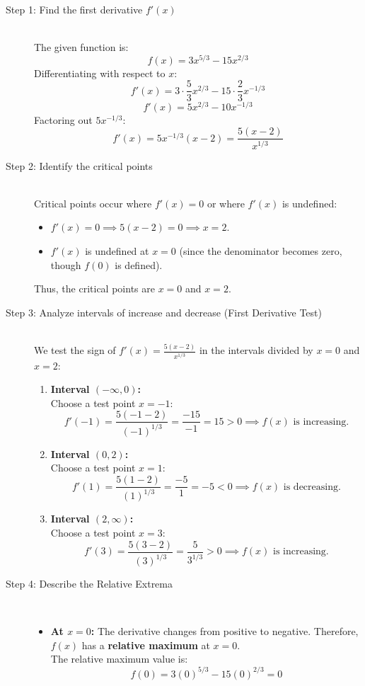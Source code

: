 \documentclass[11pt, a4paper]{article}
\begin{document}
\begin{description}
    \item[Step 1: Find the first derivative $f'(x)$] \ \\
    The given function is:
    \[ f(x) = 3x^{5/3} - 15x^{2/3} \]
    Differentiating with respect to $x$:
    \[ f'(x) = 3 \cdot \frac{5}{3}x^{2/3} - 15 \cdot \frac{2}{3}x^{-1/3} \]
    \[ f'(x) = 5x^{2/3} - 10x^{-1/3} \]
    Factoring out $5x^{-1/3}$:
    \[ f'(x) = 5x^{-1/3}(x - 2) = \frac{5(x - 2)}{x^{1/3}} \]

    \item[Step 2: Identify the critical points] \ \\
    Critical points occur where $f'(x) = 0$ or where $f'(x)$ is undefined:
    \begin{itemize}
        \item $f'(x) = 0 \implies 5(x - 2) = 0 \implies x = 2$.
        \item $f'(x)$ is undefined at $x = 0$ (since the denominator becomes zero, though $f(0)$ is defined).
    \end{itemize}
    Thus, the critical points are $x = 0$ and $x = 2$.

    \item[Step 3: Analyze intervals of increase and decrease (First Derivative Test)] \ \\
    We test the sign of $f'(x) = \frac{5(x - 2)}{x^{1/3}}$ in the intervals divided by $x = 0$ and $x = 2$:
    \begin{enumerate}
        \item \textbf{Interval $(-\infty, 0)$:} \\
        Choose a test point $x = -1$:
        \[ f'(-1) = \frac{5(-1 - 2)}{(-1)^{1/3}} = \frac{-15}{-1} = 15 > 0 \implies f(x) \text{ is increasing.} \]

        \item \textbf{Interval $(0, 2)$:} \\
        Choose a test point $x = 1$:
        \[ f'(1) = \frac{5(1 - 2)}{(1)^{1/3}} = \frac{-5}{1} = -5 < 0 \implies f(x) \text{ is decreasing.} \]

        \item \textbf{Interval $(2, \infty)$:} \\
        Choose a test point $x = 3$:
        \[ f'(3) = \frac{5(3 - 2)}{(3)^{1/3}} = \frac{5}{3^{1/3}} > 0 \implies f(x) \text{ is increasing.} \]
    \end{enumerate}

    \item[Step 4: Describe the Relative Extrema] \ 
    \begin{itemize}
        \item \textbf{At $x = 0$:} The derivative changes from positive to negative. Therefore, $f(x)$ has a \textbf{relative maximum} at $x = 0$. \\
        The relative maximum value is:
        \[ f(0) = 3(0)^{5/3} - 15(0)^{2/3} = 0 \]
        

\end{itemize}
\end{description}
\end{document}
